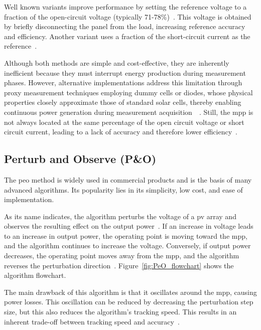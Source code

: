          Well known variants improve performance by setting the reference voltage to a fraction of the open-circuit voltage (typically 71-78\%)~\cite{Comparison_PV_Array_MPPT_Techniques_2007}. This voltage is obtained by briefly disconnecting the panel from the load, increasing reference accuracy and efficiency. Another variant uses a fraction of the short-circuit current as the reference~\cite{MPPT_Comparison_techniques}.
         

        Although both methods are simple and cost-effective, they are inherently inefficient because they must interrupt energy production during measurement phases. However, alternative implementations address this limitation through proxy measurement techniques employing dummy cells or diodes, whose physical properties closely approximate those of standard solar cells, thereby enabling continuous power generation during measurement acquisition~\cite{Comparison_PV_Array_MPPT_Techniques_2007}~\cite{Optimum_Operating_Point_Tracker_2004}. Still, the \ac{mpp} is not always located at the same percentage of the open circuit voltage or short circuit current, leading to a lack of accuracy and therefore lower efficiency~\cite{Comparative_study_MPPT_algorithms_2000}.


    \subsection{Perturb and Observe (P\&O)}
        The \ac{peo} method is widely used in commercial products and is the basis of many advanced algorithms. Its popularity lies in its simplicity, low cost, and ease of implementation.

        As its name indicates, the algorithm perturbs the voltage of a \acs{pv} array and observes the resulting effect on the output power~\cite{chermitti2012improvement}. If an increase in voltage leads to an increase in output power, the operating point is moving toward the \ac{mpp}, and the algorithm continues to increase the voltage. Conversely, if output power decreases, the operating point moves away from the \ac{mpp}, and the algorithm reverses the perturbation direction~\cite {PeO_and_Newton_Raphson_Comparison,Look-Up-Table_VS_PeO}. Figure~\ref{fig:PeO_flowchart} shows the algorithm flowchart.
                

        The main drawback of this algorithm is that it oscillates around the \ac{mpp}, causing power losses. This oscillation can be reduced by decreasing the perturbation step size, but this also reduces the algorithm's tracking speed. This results in an inherent trade-off between tracking speed and accuracy~\cite{MPPT_Comparison_techniques,Comparison_PV_Array_MPPT_Techniques_2007}.


